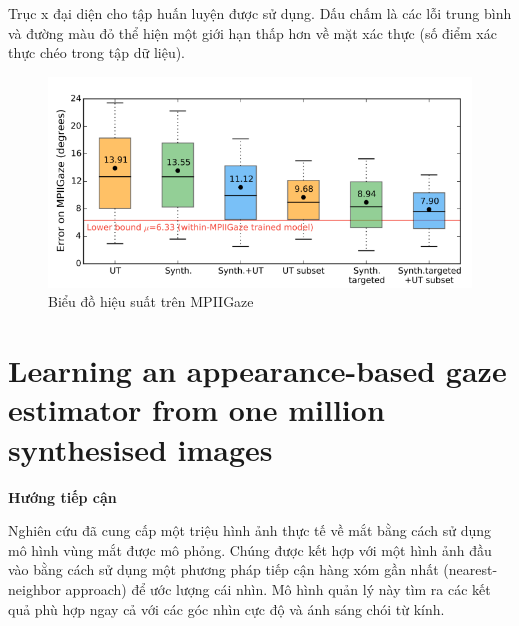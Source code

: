 Trục x đại diện cho tập huấn luyện được sử dụng. Dấu chấm là các lỗi trung bình và đường màu đỏ thể hiện một giới hạn thấp hơn về mặt xác thực (số điểm xác thực chéo trong tập dữ liệu).

\begin{center}
    \begin{figure}[h!]
    \begin{center}
     \includegraphics[scale=0.70]{img/Performance_chart_on_MPIIGaze.png}
    \end{center}
    \caption{Biểu đồ hiệu suất trên MPIIGaze}
    \label{refhinh15}
    \end{figure}
\end{center}

\section{Learning an appearance-based gaze estimator from one million synthesised images \cite{Learninganappearancebasedgazeestimator}}

\textbf{Hướng tiếp cận}

Nghiên cứu đã cung cấp một triệu hình ảnh thực tế về mắt bằng cách sử dụng mô hình vùng mắt được mô phỏng. Chúng được kết hợp với một hình ảnh đầu vào bằng cách sử dụng một phương pháp tiếp cận hàng xóm gần nhất (nearest-neighbor approach) để ước lượng cái nhìn. Mô hình quản lý này tìm ra các kết quả phù hợp ngay cả với các góc nhìn cực độ và ánh sáng chói từ kính.

